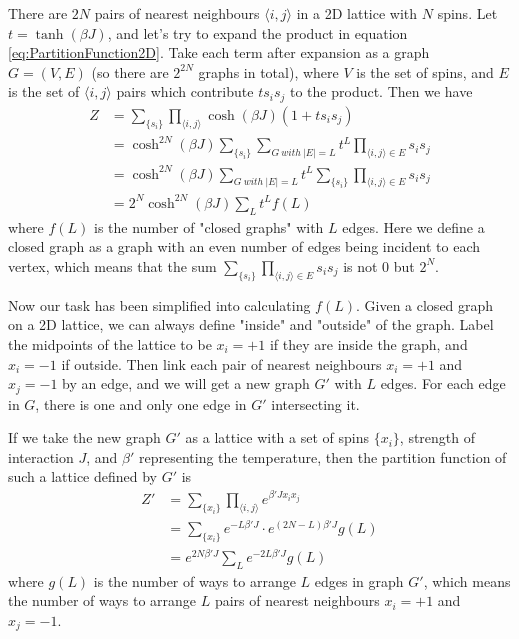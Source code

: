 \documentclass[11pt]{article}
\begin{document}
	There are $2N$ pairs of nearest neighbours $\langle i,j \rangle$ in a 2D lattice with $N$ spins.
	Let $t = \tanh(\beta J)$, and let's try to expand the product in equation \eqref{eq:PartitionFunction2D}.
	Take each term after expansion as a graph $G = (V, E)$ (so there are $2^{2N}$ graphs in total), 
	where $V$ is the set of spins, 
	and $E$ is the set of $\langle i,j \rangle$ pairs which contribute $t s_i s_j$ to the product.
	Then we have
	\begin{equation} \label{eq:PartitionFunction2DTransformed}
		\begin{aligned}
			Z &= \sum_{\{s_i\}} \prod_{\langle i,j \rangle} \cosh(\beta J)(1 + t s_i s_j) \\
			&= \cosh^{2N}(\beta J) \sum_{\{s_i\}} \sum_{G\ with\ |E|=L} t^L \prod_{\langle i,j \rangle \in E} s_i s_j \\
			&= \cosh^{2N}(\beta J) \sum_{G\ with\ |E|=L} t^L \sum_{\{s_i\}} \prod_{\langle i,j \rangle \in E} s_i s_j \\
			&= 2^N \cosh^{2N}(\beta J) \sum_{L} t^L f(L)
		\end{aligned}
	\end{equation}
	where $f(L)$ is the number of "closed graphs" with $L$ edges.
	Here we define a closed graph as a graph with an even number of edges being incident to each vertex, 
	which means that the sum $\sum_{\{s_i\}} \prod_{\langle i,j \rangle \in E} s_i s_j$ is not $0$ but $2^N$.

	Now our task has been simplified into calculating $f(L)$.
	Given a closed graph on a 2D lattice, we can always define "inside" and "outside" of the graph.
	Label the midpoints of the lattice to be $x_i=+1$ if they are inside the graph, and $x_i=-1$ if outside.
	Then link each pair of nearest neighbours $x_i=+1$ and $x_j=-1$ by an edge, 
	and we will get a new graph $G'$ with $L$ edges.
	For each edge in $G$, there is one and only one edge in $G'$ intersecting it.


	If we take the new graph $G'$ as a lattice with a set of spins $\{x_i\}$, 
	strength of interaction $J$, and $\beta'$ representing the temperature,
	then the partition function of such a lattice defined by $G'$ is
	\begin{equation} \label{eq:PartitionFunction2DNewLattice}
		\begin{aligned}
			Z' &= \sum_{\{x_i\}} \prod_{\langle i,j \rangle} e^{\beta' J x_i x_j} \\
			&= \sum_{\{x_i\}} e^{-L\beta' J} \cdot e^{(2N-L)\beta' J} g(L) \\
			&= e^{2N\beta' J} \sum_{L} e^{-2L\beta' J} g(L)
		\end{aligned}
	\end{equation}
	where $g(L)$ is the number of ways to arrange $L$ edges in graph $G'$, 
	which means the number of ways to arrange $L$ pairs of nearest neighbours $x_i=+1$ and $x_j=-1$.
	
\end{document}
